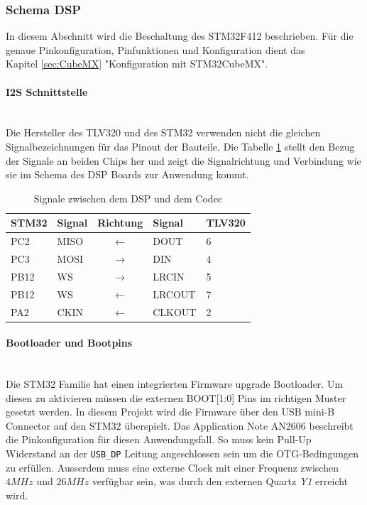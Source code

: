 \subsubsection{Schema DSP}
\label{sec:Schema_DSP}

In diesem Abschnitt wird die Beschaltung des STM32F412 beschrieben. Für die genaue Pinkonfiguration, Pinfunktionen und Konfiguration dient das \\
Kapitel \ref{sec:CubeMX} "Konfiguration mit STM32CubeMX".
\\
\paragraph{I2S Schnittstelle}\vspace{-0.3cm}\\
Die Hersteller des TLV320 und des STM32 verwenden nicht die gleichen Signalbezeichnungen für das Pinout der Bauteile.
Die Tabelle \ref{tab:I2SPins} stellt den Bezug der Signale an beiden Chips her und zeigt die Signalrichtung und Verbindung wie sie im Schema des DSP Boards zur Anwendung kommt.

\begin{table}[H]
	\centering
	\begin{tabular}{|l|l|c|l|l|}
	\hline
	\textbf{STM32} & \textbf{Signal} & \textbf{Richtung}         & \textbf{Signal} & \textbf{TLV320} \\ \hline
	PC2            & MISO            & $\leftarrow$  & DOUT            & 6               \\ \hline
	PC3            & MOSI            & $\rightarrow$ & DIN             & 4               \\ \hline
	PB12           & WS              & $\rightarrow$ & LRCIN           & 5               \\ \hline
	PB12           & WS              & $\leftarrow$  & LRCOUT          & 7               \\ \hline
	PA2            & CKIN            & $\leftarrow$  & CLKOUT          & 2               \\ \hline
	\end{tabular}
	\caption{Signale zwischen dem DSP und dem Codec}
	\label{tab:I2SPins}
\end{table}

\paragraph{Bootloader und Bootpins}\vspace{-0.3cm}\\
Die STM32 Familie hat einen integrierten Firmware upgrade Bootloader.
Um diesen zu aktivieren müssen die externen BOOT[1:0] Pins im richtigen Muster gesetzt werden.
In diesem Projekt wird die Firmware über den USB mini-B Connector auf den STM32 überspielt.
Das Application Note AN2606 \cite[p.136]{AN2606} beschreibt die Pinkonfiguration für diesen Anwendungsfall.
So muss kein Pull-Up Widerstand an der \texttt{USB\_DP} Leitung angeschlossen sein um die OTG-Bedingungen zu erfüllen.
Ausserdem muss eine externe Clock mit einer Frequenz zwischen $4\si{MHz}$ und $26\si{MHz}$ verfügbar sein, was durch den externen Quartz \textit{Y1} erreicht wird.

